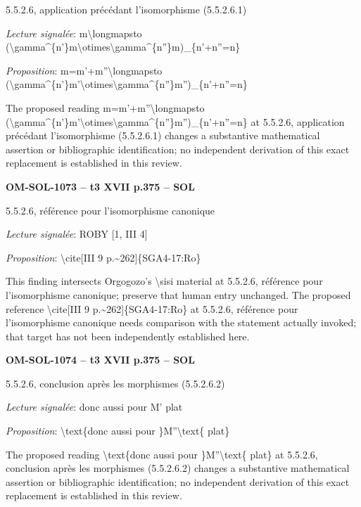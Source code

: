 5.5.2.6, application précédant l'isomorphisme (5.5.2.6.1)\par
\emph{Lecture signalée}: m\textbackslash{}longmapsto (\textbackslash{}gamma\textasciicircum{}\{n'\}m\textbackslash{}otimes\textbackslash{}gamma\textasciicircum{}\{n''\}m)\_\{n'+n''=\allowbreak n\}\par
\emph{Proposition}: m=\allowbreak m'+m''\textbackslash{}longmapsto (\textbackslash{}gamma\textasciicircum{}\{n'\}m'\textbackslash{}otimes\textbackslash{}gamma\textasciicircum{}\{n''\}m'')\_\{n'+n''=\allowbreak n\}\par
The proposed reading m=\allowbreak m'+m''\textbackslash{}longmapsto (\textbackslash{}gamma\textasciicircum{}\{n'\}m'\textbackslash{}otimes\textbackslash{}gamma\textasciicircum{}\{n''\}m'')\_\{n'+n''=\allowbreak n\} at 5.5.2.6, application précédant l'isomorphisme (5.5.2.6.1) changes a substantive mathematical assertion or bibliographic identification; no independent derivation of this exact replacement is established in this review.\par
\par\noindent\textbf{OM-SOL-1073 -- t3 XVII p.375 -- SOL}\par
5.5.2.6, référence pour l'isomorphisme canonique\par
\emph{Lecture signalée}: ROBY [1, III 4]\par
\emph{Proposition}: \textbackslash{}cite[III 9 p.\textasciitilde{}262]\{SGA4-17:Ro\}\par
This finding intersects Orgogozo's \textbackslash{}sisi material at 5.5.2.6, référence pour l'isomorphisme canonique; preserve that human entry unchanged. The proposed reference \textbackslash{}cite[III 9 p.\textasciitilde{}262]\{SGA4-17:Ro\} at 5.5.2.6, référence pour l'isomorphisme canonique needs comparison with the statement actually invoked; that target has not been independently established here.\par
\par\noindent\textbf{OM-SOL-1074 -- t3 XVII p.375 -- SOL}\par
5.5.2.6, conclusion après les morphismes (5.5.2.6.2)\par
\emph{Lecture signalée}: donc aussi pour M' plat\par
\emph{Proposition}: \textbackslash{}text\{donc aussi pour \}M''\textbackslash{}text\{ plat\}\par
The proposed reading \textbackslash{}text\{donc aussi pour \}M''\textbackslash{}text\{ plat\} at 5.5.2.6, conclusion après les morphismes (5.5.2.6.2) changes a substantive mathematical assertion or bibliographic identification; no independent derivation of this exact replacement is established in this review.\par
